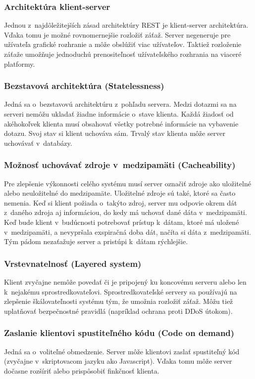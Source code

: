 \documentclass[slovak,cprint]{fitthesis} %
\begin{document}
\subsubsection{Architektúra klient-server}
Jednou z~najdôležitejších zásad architektúry REST je klient-server architektúra. Vďaka tomu je možné rovnomernejšie rozložiť záťaž. Server negeneruje pre užívateľa grafické rozhranie a môže obslúžiť viac užívateľov. Taktiež rozloženie záťaže umožňuje jednoduchú prenositeľnosť užívateľského rozhrania na viaceré platformy.

\subsubsection{Bezstavová architektúra (Statelessness)}
Jedná sa o~bezstavovú architektúru z~pohľadu servera. Medzi dotazmi sa na serveri nemôžu ukladať žiadne informácie o~stave klienta. Každá žiadosť od akéhokoľvek klienta musí obsahovať všetky potrebné informácie na vybavenie dotazu. Svoj stav si klient uchováva sám. Trvalý stav klienta môže server uchovávať v~databázy.

\subsubsection{Možnosť uchovávať zdroje v~medzipamäti (Cacheability)}
Pre zlepšenie výkonnosti celého systému musí server označiť zdroje ako uložitelné alebo neuložitelné do medzipamäte. Uložitelné zdroje sú také, ktoré sa často nemenia. Keď si klient požiada o~takýto zdroj, server mu odpovie okrem dát z~daného zdroja aj informáciou, do kedy má uchovať dané dáta v~medzipamäti. Keď bude klient v~budúcnosti potrebovať prístup k~dátam, ktoré má uložené v~medzipamäti, a nevypršala exspiračná doba dát, načíta si dáta z~medzipamäti. Tým pádom nezaťažuje server a pristúpi k~dátam rýchlejšie. 

\subsubsection{Vrstevnatelnosť (Layered system)}
Klient zvyčajne nemôže povedať či je pripojený ku koncovému serveru alebo len k~nejakému sprostredkovateľovi. Sprostredkovateľské servery sa používajú na zlepšenie škálovateľnosti systému tým, že umožnia rozložiť záťaž. Môžu tiež uplatňovať bezpečnostné pravidlá (napríklad ochrana proti DDoS útokom).

\subsubsection{Zaslanie klientovi spustiteľného kódu (Code on demand)}
Jedná sa o~voliteľné obmedzenie. Server môže klientovi zaslať spustiteľný kód (zvyčajne v~skriptovacom jazyku ako Javascript). Vďaka tomu môže server dočasne rozšíriť alebo prispôsobiť finkčnosť klienta.
\end{document}
